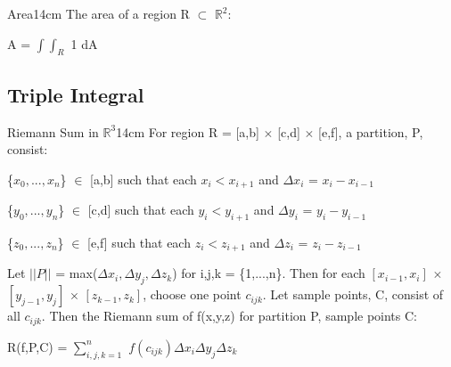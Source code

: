     \vspace{0.5cm}



    \begin{definition}{Area}{14cm}
        The {\color{lblue} area} of a region R $\subset$ $\mathbb{R}^2$:

        \hspace{0.5cm}
        A = $\int \int_R$ 1 dA
    \end{definition}

    \newpage





\subsection{ Triple Integral }

        \begin{definition}{Riemann Sum in $\mathbb{R}^3$}{14cm}
        For region R = [a,b] $\times$ [c,d] $\times$ [e,f],
        a {\color{lblue} partition}, P, consist:
        
        \hspace{0.5cm}
        \{$x_0,...,x_n$\} $\in$ [a,b] such that each $x_i < x_{i+1}$
        and $\Delta x_i$ = $x_i - x_{i-1}$
        
        \hspace{0.5cm}
        \{$y_0,...,y_n$\} $\in$ [c,d] such that each $y_i < y_{i+1}$
        and $\Delta y_i$ = $y_i - y_{i-1}$

        \hspace{0.5cm}
        \{$z_0,...,z_n$\} $\in$ [e,f] such that each $z_i < z_{i+1}$
        and $\Delta z_i$ = $z_i - z_{i-1}$

        Let $||P||$ = max($\Delta x_i,\Delta y_j,\Delta z_k$)
        for i,j,k = \{1,...,n\}.
        Then for each $[x_{i-1},x_i]$ $\times$ $[y_{j-1},y_j]$
        $\times$ $[z_{k-1},z_k]$,
        choose one point $c_{ijk}$.
        Let {\color{lblue} sample points}, C, consist of all $c_{ijk}$.
        Then the {\color{lblue} Riemann sum} of f(x,y,z) for partition P,
        sample points C:

        \hspace{0.5cm}
        R(f,P,C) = $\sum_{i,j,k=1}^n$ $f(c_{ijk}) \Delta x_i \Delta y_j \Delta z_k$
    \end{definition}

    \vspace{0.5cm}



